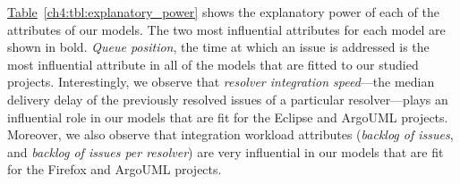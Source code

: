 \noindent\DIFdelbegin \textbf{\textit{}%
}
\DIFdelend \DIFaddbegin {}
\DIFaddend \hyperref[ch4:tbl:explanatory_power]{Table}~\ref{ch4:tbl:explanatory_power} shows the
explanatory power of each of the attributes of our models. The two most
influential attributes for each model are shown in bold. \textit{Queue
position}, \ie the time at which an issue is addressed is the most influential
attribute in all of the models that are fitted to our studied projects.
Interestingly, we observe that \textit{resolver integration speed}---the median
delivery delay of the previously resolved issues of a particular
resolver---plays an influential role in our models that are fit for the Eclipse
and ArgoUML projects. Moreover, we also observe that integration workload
attributes (\ie \textit{backlog of issues}, and \textit{backlog of issues per
resolver}) are very influential in our models that are fit for the Firefox and
ArgoUML projects.\\


